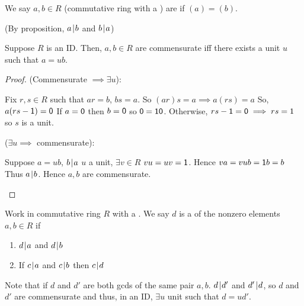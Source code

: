 \documentclass[notes.tex]{subfiles}
\begin{document}
\begin{defn}
	We say $a, b\in R$ (commutative ring with a \one) are  if $(a) = (b)$.

	(By proposition, $a\mkern2mu|\mkern1mu b$ and $b\mkern2mu|\mkern1mu a$)
\end{defn}

\begin{proposition}
	Suppose $R$ is an ID.
	Then, $a,b\in R$ are commensurate iff there exists a unit $u$ such that $a=ub$.
\end{proposition}
\begin{proof}
	(Commensurate $\implies \exists u$):
	\begin{tabin}
		Fix $r, s\in R$ such that $ar = b$, $bs = a$.
		So $(ar)s = a \implies a(rs) = a$ So, $a(rs-\mathsf{1}) = \mathsf{0}$
		If $a = \mathsf{0}$ then $b= \mathsf{0}$ so $\mathsf{0}=\mathsf{1}\mathsf{0}$.
		Otherwise, $rs - \mathsf{1} = \mathsf{0} \implies rs = 1$ so $s$ is a unit.
	\end{tabin}
	($\exists u \implies$ commensurate):
	\begin{tabin}
		Suppose $a=ub$, $b\mkern2mu|\mkern1mu a$ $u$ a unit, $\exists v\in R$ $vu = uv = \mathsf{1}$. Hence $va = vub = \mathsf{1} b = b$ Thus $a\mkern2mu|\mkern1mu b$. Hence $a, b$ are commensurate.
	\end{tabin}
\end{proof}

\begin{defn}
	Work in commutative ring $R$ with a \one. We say $d$ is a  of the nonzero elements $a,b\in R$ 
	if 
	\begin{enumerate}
		\item $d\mkern2mu|\mkern1mu a$ and $d\mkern2mu|\mkern1mu b$
		\item If $c\mkern2mu|\mkern1mu a$ and $c\mkern2mu|\mkern1mu b$ then $c\mkern2mu|\mkern1mu d$
	\end{enumerate}
\end{defn}

Note that if $d$ and $d'$ are both gcds of the same pair $a,b$. $d\mkern2mu|\mkern1mu d'$ and $d'\mkern2mu|\mkern1mu d$, so $d$ and $d'$ are commensurate and thus, in an ID, $\exists u$ unit such that $d = ud'$.
\end{document}
